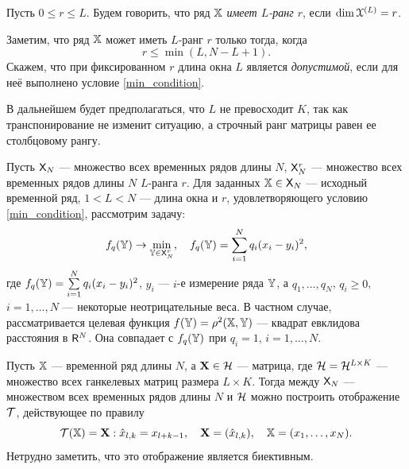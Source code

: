 \documentclass[12pt,a4paper,fleqn,leqno]{article}
\begin{document}
\begin{definition}
Пусть $0 \le r \le L$. Будем говорить, что ряд $\mathbb{X}$ \emph{имеет $L$-ранг $r$}, если $\dim \EuScript{X}^{(L)} = r$.
\end{definition}

Заметим, что ряд $\mathbb{X}$ может иметь $L$-ранг $r$ только тогда, когда
\begin{equation}
r \le \min(L, N-L+1). \label{min_condition}
\end{equation}
Скажем, что при фиксированном $r$ длина окна $L$ является \emph{допустимой}, если для неё выполнено условие \eqref{min_condition}.

В дальнейшем будет предполагаться, что $L$ не превосходит $K$, так как транспонирование не изменит ситуацию, а строчный ранг матрицы равен ее столбцовому рангу.

Пусть $\mathsf{X}_N$ --- множество всех временных рядов длины $N$, $\mathsf{X}_N^r$ --- множество всех временных рядов длины $N$ $L$-ранга $r$. Для заданных $\mathbb{X} \in \mathsf{X}_N$ --- исходный временной ряд, $1 < L < N$ --- длина окна и $r$, удовлетворяющего условию \eqref{min_condition}, рассмотрим задачу:
\begin{equation} \label{L-rank_task}
f_q(\mathbb{Y}) \to \min_{\mathbb{Y} \in \mathsf{X}_N^r}, \quad f_q(\mathbb{Y}) = \sum \limits_{i=1}^N q_i(x_i - y_i)^2,
\end{equation}
где $f_q(\mathbb{Y}) = \sum \limits_{i=1}^N q_i(x_i - y_i)^2$, $y_i$ --- $i$-е измерение ряда $\mathbb{Y}$, а $q_1, \ldots, q_N$, $q_i \ge 0$, $i = 1, \ldots, N$ --- некоторые неотрицательные веса. В частном случае, рассматривается целевая функция $f(\mathbb{Y}) = \rho^2(\mathbb{X}, \mathbb{Y})$ --- квадрат евклидова расстояния в $\mathsf{R}^N$. Она совпадает с $f_q(\mathbb{Y})$ при $q_i = 1$, $i = 1, \ldots, N$.

Пусть $\mathbb{X}$ --- временной ряд длины $N$, а $\mathbf{X} \in \mathcal{H}$ --- матрица, где $\mathcal{H} = \mathcal{H}^{L \times K}$ --- множество всех ганкелевых матриц размера $L \times K$. Тогда между $\mathsf{X}_N$ --- множеством всех временных рядов длины $N$ и $\mathcal{H}$ можно построить отображение $\mathcal{T}$, действующее по правилу
\begin{equation*}
\mathcal{T}(\mathbb{X}) = \mathbf{X}: \hat x_{l, k} = x_{l + k - 1}, \quad \mathbf{X} = (\hat x_{l,k}), \quad \mathbb{X} = (x_1, \ldots, x_N).
\end{equation*}
Нетрудно заметить, что это отображение является биективным.
\end{document}
